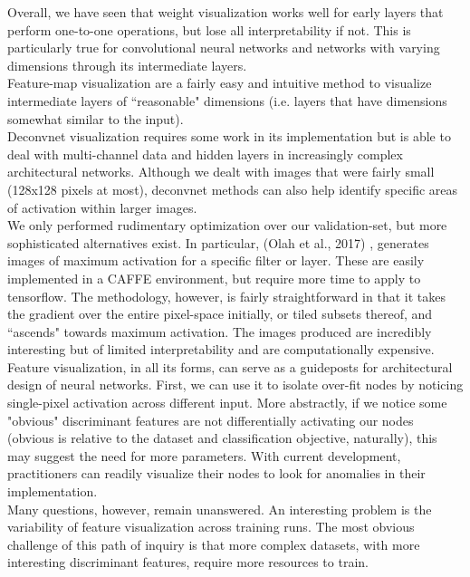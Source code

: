 \documentclass[12pt]{article}
\begin{document}
Overall, we have seen that weight visualization works well for early layers that perform one-to-one operations, but lose all interpretability if not. This is particularly true for convolutional neural networks and networks with varying dimensions through its intermediate layers. \\

Feature-map visualization are a fairly easy and intuitive method to visualize intermediate layers of ``reasonable" dimensions (i.e. layers that have dimensions somewhat similar to the input). \\

Deconvnet visualization requires some work in its implementation but is able to deal with multi-channel data and hidden layers in increasingly complex architectural networks. Although we dealt with images that were fairly small (128x128 pixels at most), deconvnet methods can also help identify specific areas of activation within larger images. \\

We only performed rudimentary optimization over our validation-set, but more sophisticated alternatives exist. In particular, (Olah et al., 2017) \cite{distill}, generates images of maximum activation for a specific filter or layer. These are easily implemented in a CAFFE environment, but require more time to apply to tensorflow. The methodology, however, is fairly straightforward in that it takes the gradient over the entire pixel-space initially, or tiled subsets thereof, and ``ascends" towards maximum activation. The images produced are incredibly interesting but of limited interpretability and are computationally expensive. \\

Feature visualization, in all its forms, can serve as a guideposts for architectural design of neural networks. First, we can use it to isolate over-fit nodes by noticing single-pixel activation across different input. More abstractly, if we notice some "obvious" discriminant features are not differentially activating our nodes (obvious is relative to the dataset and classification objective, naturally), this may suggest the need for more parameters. With current development, practitioners can readily visualize their nodes to look for anomalies in their implementation.\\


Many questions, however, remain unanswered. An interesting problem is the variability of feature visualization across training runs. The most obvious challenge of this path of inquiry is that more complex datasets, with more interesting discriminant features, require more resources to train. \\
\end{document}
